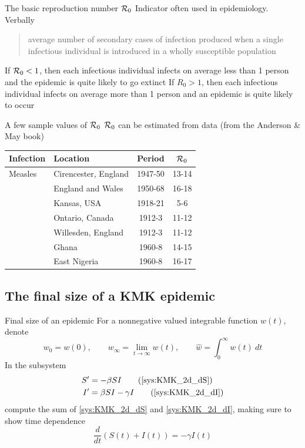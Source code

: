 \documentclass[aspectratio=169]{beamer}\usepackage[]{graphicx}\usepackage[]{xcolor}
\begin{document}
\begin{frame}{The basic reproduction number $\mathcal{R}_0$}
\bbullet Indicator often used in epidemiology. Verbally
\begin{quote}
  average number of secondary cases of infection produced when a single infectious individual is introduced in a wholly susceptible population
\end{quote}
\vfill
\bbullet If $\mathcal{R}_0<1$, then each infectious individual infects on average less than 1 person and the epidemic is quite likely to go extinct 
\vfill
\bbullet If $R_0>1$, then each infectious individual infects on average more than 1 person and an epidemic is quite likely to occur
\end{frame}

\begin{frame}{A few sample values of $\mathcal{R}_0$}
  $\mathcal{R}_0$ can be estimated from data (from the Anderson \& May book)
  \vfill
  \begin{center}
  \begin{tabular}{llcc}
  \hline 
  Infection & Location & Period & $\mathcal{R}_0$ \\
  \hline
  Measles & Cirencester, England & 1947-50 & 13-14 \\
  & England and Wales & 1950-68 & 16-18 \\
  & Kansas, USA & 1918-21 & 5-6 \\
  & Ontario, Canada & 1912-3 & 11-12 \\
  & Willesden, England & 1912-3 & 11-12 \\
  & Ghana & 1960-8 & 14-15 \\
  & East Nigeria & 1960-8 & 16-17 \\
  \end{tabular}
  \end{center}
\end{frame}
    

\subsection{The final size of a KMK epidemic}

\begin{frame}{Final size of an epidemic}
  For a nonnegative valued integrable function $w(t)$, denote
  $$
  w_0=w(0),\qquad  w_\infty = \lim_{t\to\infty}w(t),\qquad\hat w = \int_0^\infty w(t)\ dt
  $$
  \vfill
  In the subsystem
  \begin{align}
  S' &= -\beta SI \tag{\ref{sys:KMK_2d_dS}} \\
  I' &= \beta SI-\gamma I \tag{\ref{sys:KMK_2d_dI}} 
  \end{align}
  compute the sum of \eqref{sys:KMK_2d_dS} and \eqref{sys:KMK_2d_dI}, making sure to show time dependence $$
  \frac{d}{dt}(S(t)+I(t))=-\gamma I(t)
  $$
\end{frame}
\end{document}
